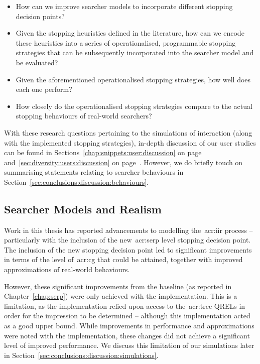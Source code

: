 \begin{itemize}
    \item{ How can we improve searcher models to incorporate different stopping decision points?}
    \item{ Given the stopping heuristics defined in the literature, how can we encode these heuristics into a series of operationalised, programmable stopping strategies that can be subsequently incorporated into the searcher model and be evaluated?}
    \item{ Given the aforementioned operationalised stopping strategies, how well does each one perform?}
    \item{ How closely do the operationalised stopping strategies compare to the actual stopping behaviours of real-world searchers?}
\end{itemize}

With these research questions pertaining to the simulations of interaction (along with the implemented stopping strategies), in-depth discussion of our user studies can be found in Sections~\ref{chap:snippets:user:discussion} on page~\pageref{chap:snippets:user:discussion} and~\ref{sec:diversity:users:discussion} on page~\pageref{sec:diversity:users:discussion}. However, we do briefly touch on summarising statements relating to searcher behaviours in Section~\ref{sec:conclusions:discussion:behaviours}.

\subsection{Searcher Models and Realism}\label{sec:conclusions:discussion:realism}
Work in this thesis has reported advancements to modelling the~\gls{acr:iir} process -- particularly with the inclusion of the new~\gls{acr:serp} level stopping decision point. The inclusion of the new stopping decision point led to significant improvements in terms of the level of~\gls{acr:cg} that could be attained, together with improved approximations of real-world behaviours.

However, these significant improvements from the  baseline (as reported in Chapter~\ref{chap:serp}) were only achieved with the  implementation. This is a limitation, as the implementation relied upon access to the~\gls{acr:trec} QRELs in order for the impression to be determined -- although this implementation acted as a good upper bound. While improvements in performance and approximations were noted with the  implementation, these changes did not achieve a significant level of improved performance. We discuss this limitation of our simulations later in Section~\ref{sec:conclusions:discussion:simulations}.


